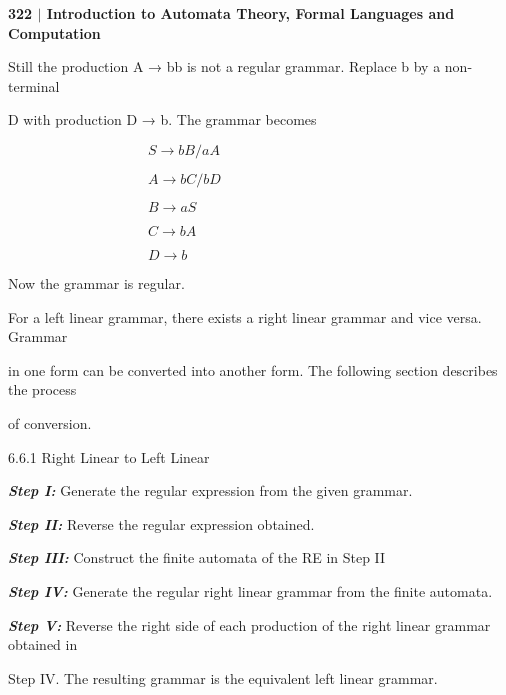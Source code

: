 \documentclass[10pt,a4paper]{book}
\begin{document}
\small

\begin{flushleft}
\small\textsf{\textbf{322 $|$ Introduction to Automata Theory, Formal Languages and Computation}}
\end{flushleft}

\begin{flushleft}
Still the production A → bb is not a regular grammar. Replace b by a non-terminal

D with production D → b. The grammar becomes

\qquad\end{flushleft}

  $\qquad\qquad\qquad\qquad\qquad S \rightarrow bB/aA$

  $\qquad\qquad\qquad\qquad\qquad A \rightarrow bC/bD$

  $\qquad\qquad\qquad\qquad\qquad B \rightarrow aS$

  $\qquad\qquad\qquad\qquad\qquad  C \rightarrow bA$

   $\qquad\qquad\qquad\qquad\qquad  D \rightarrow b$

\qquad

Now the grammar is regular.

\footnotesize For a left linear grammar, there exists a right linear grammar and vice versa. Grammar

\!\!\!\!\!in one form can be converted into another form. The following section describes the process

\!\!\!\!\!of conversion.

\begin{flushleft}
\!\!\!\!\!\large 6.6.1 \; \textsf{Right Linear to Left Linear}
\end{flushleft}

\begin{flushleft}
\!\!\!\!\!\textbf{\emph{Step I:}} Generate the regular expression from the given grammar.

\!\!\!\!\!\textbf{\emph{Step II:}} Reverse the regular expression obtained.

\!\!\!\!\!\textbf{\emph{Step III:}} Construct the finite automata of the RE in Step II

\!\!\!\!\!\textbf{\emph{Step IV:}} Generate the regular right linear grammar from the finite automata.

\!\!\!\!\!\textbf{\emph{Step V:}} Reverse the right side of each production of the right linear grammar obtained in

\!\!\!\!\!Step IV. The resulting grammar is the equivalent left linear grammar.
\end{flushleft}
\end{document}
